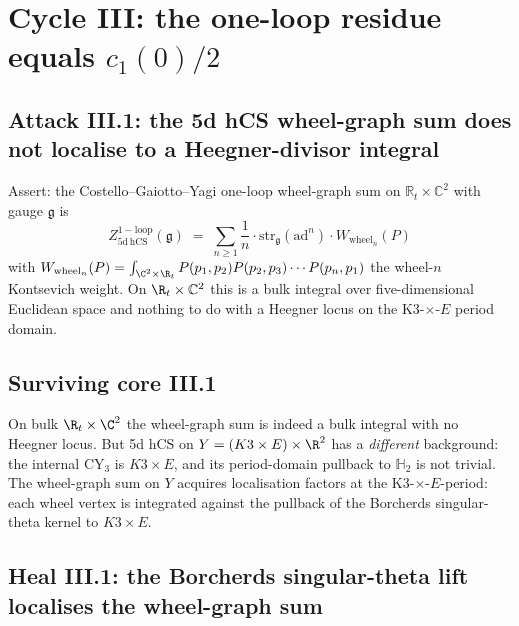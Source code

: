 \section*{Cycle III: the one-loop residue equals $c_1(0)/2$}
\label{sec:BL-4-cycle-3}

\subsection*{Attack III.1: the 5d hCS wheel-graph sum does not
localise to a Heegner-divisor integral}

Assert: the Costello--Gaiotto--Yagi one-loop wheel-graph sum on
$\mathbb{R}_t \times \mathbb{C}^2$ with gauge $\mathfrak{g}$ is
\begin{equation}
\label{eq:wheel-graph-sum}
 Z^{\mathrm{1-loop}}_{5\mathrm{d\,hCS}}(\mathfrak{g})
 \;=\; \sum_{n \geq 1}
 \frac{1}{n} \cdot \mathrm{str}_\mathfrak{g}(\mathrm{ad}^n)
 \cdot W_{\mathrm{wheel}_n}(P)
\end{equation}
with $W_{\mathrm{wheel}_n}(P) = \int_{\C^2 \times \R_t}
P(p_1, p_2) P(p_2, p_3) \cdots P(p_n, p_1)$ the wheel-$n$ Kontsevich
weight. On $\R_t \times \mathbb{C}^2$ this is a bulk integral over
five-dimensional Euclidean space and nothing to do with a Heegner
locus on the K3-$\times$-$E$ period domain.

\subsection*{Surviving core III.1}

On bulk $\R_t \times \C^2$ the wheel-graph sum is indeed a bulk
integral with no Heegner locus. But 5d hCS on
$Y = (K3 \times E) \times \R^2$ has a \emph{different} background: the
internal CY$_3$ is $K3 \times E$, and its period-domain pullback to
$\mathbb{H}_2$ is not trivial. The wheel-graph sum on $Y$ acquires
localisation factors at the K3-$\times$-$E$-period: each wheel vertex
is integrated against the pullback of the Borcherds singular-theta
kernel to $K3 \times E$.

\subsection*{Heal III.1: the Borcherds singular-theta lift localises
the wheel-graph sum}

